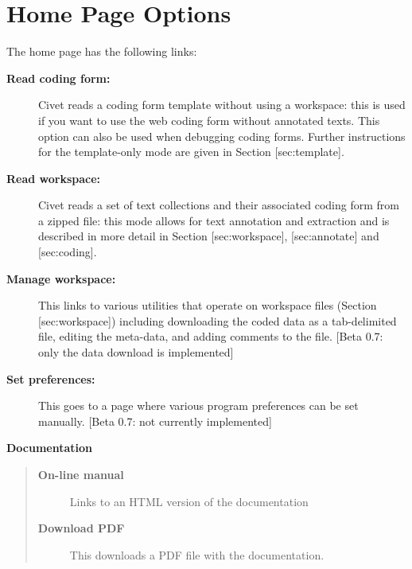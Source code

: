 \documentclass[letterpaper,10pt,english]{sphinxmanual}
\begin{document}
\chapter{Home Page Options}
\label{homepage:home-page-options}\label{homepage::doc}
The home page has the following links:
\begin{description}
\item[{\textbf{Read coding form:}}] \leavevmode
Civet reads a coding form template without using a workspace: this
is used if you want to use the web coding form without annotated
texts. This option can also be used when debugging coding forms.
Further instructions for the template-only mode are given in Section
{[}sec:template{]}.

\item[{\textbf{Read workspace:}}] \leavevmode
Civet reads a set of text collections and their associated coding
form from a zipped file: this mode allows for text annotation and
extraction and is described in more detail in Section
{[}sec:workspace{]}, {[}sec:annotate{]} and {[}sec:coding{]}.

\item[{\textbf{Manage workspace:}}] \leavevmode
This links to various utilities that operate on workspace files
(Section {[}sec:workspace{]}) including downloading the coded data as a
tab-delimited file, editing the meta-data, and adding comments to
the file. {[}Beta 0.7: only the data download is implemented{]}

\item[{\textbf{Set preferences:}}] \leavevmode
This goes to a page where various program preferences can be set
manually. {[}Beta 0.7: not currently implemented{]}

\end{description}

\textbf{Documentation}
\begin{quote}
\begin{description}
\item[{\textbf{On-line manual}}] \leavevmode
Links to an HTML version of the documentation

\item[{\textbf{Download PDF}}] \leavevmode
This downloads a PDF file with the documentation.

\end{description}
\end{quote}
\end{document}
